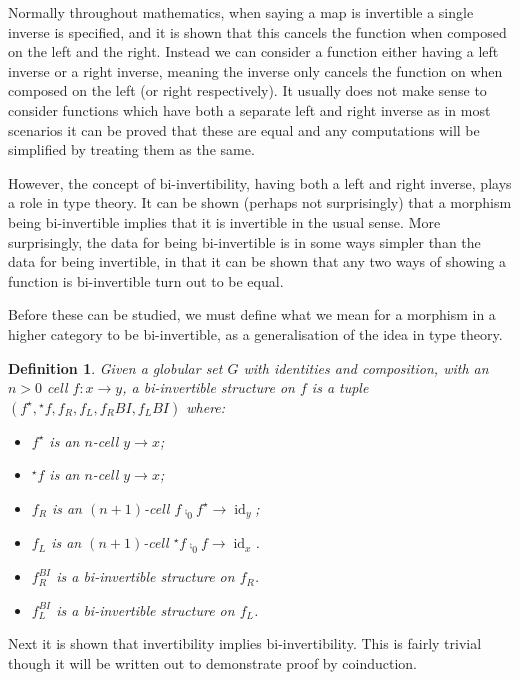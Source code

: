 \documentclass[draft]{article}
\newtheorem{definition}[theorem]{Definition} \theoremstyle{remark}
\DeclareMathOperator{\id}{id}
\newcommand{\linv}[1]{{}^\star\!#1} \newcommand{\rinv}[1]{#1^\star}
\begin{document}
Normally throughout mathematics, when saying a map is invertible a
single inverse is specified, and it is shown that this cancels the
function when composed on the left and the right. Instead we can
consider a function either having a left inverse or a right inverse,
meaning the inverse only cancels the function on when composed on the
left (or right respectively). It usually does not make sense to
consider functions which have both a separate left and right inverse
as in most scenarios it can be proved that these are equal and any
computations will be simplified by treating them as the same.

However, the concept of bi-invertibility, having both a left and right
inverse, plays a role in type theory. It can be shown (perhaps not
surprisingly) that a morphism being bi-invertible implies that it is
invertible in the usual sense. More surprisingly, the data for being
bi-invertible is in some ways simpler than the data for being
invertible, in that it can be shown that any two ways of showing a
function is bi-invertible turn out to be equal.

Before these can be studied, we must define what we mean for a
morphism in a higher category to be bi-invertible, as a generalisation
of the idea in type theory.

\begin{definition}
  Given a globular set \(G\) with identities and composition, with an
  \(n > 0\) cell \(f : x \to y\), a \emph{bi-invertible} structure on
  \(f\) is a tuple \((\rinv f, \linv f, f_R, f_L, f_R{}BI, f_L{}BI)\)
  where:
  \begin{itemize}
  \item \(\rinv f\) is an \(n\)-cell \(y \to x\);
  \item \(\linv f\) is an \(n\)-cell \(y \to x\);
  \item \(f_R\) is an \((n+1)\)-cell \(f \comp_0 \rinv f \to \id_y\);
  \item \(f_L\) is an \((n+1)\)-cell \(\linv f \comp_0 f \to \id_x\).
  \item \(f_R^{BI}\) is a bi-invertible structure on \(f_R\).
  \item \(f_L^{BI}\) is a bi-invertible structure on \(f_L\).
  \end{itemize}
\end{definition}

Next it is shown that invertibility implies bi-invertibility. This is
fairly trivial though it will be written out to demonstrate proof by
coinduction.
\end{document}
